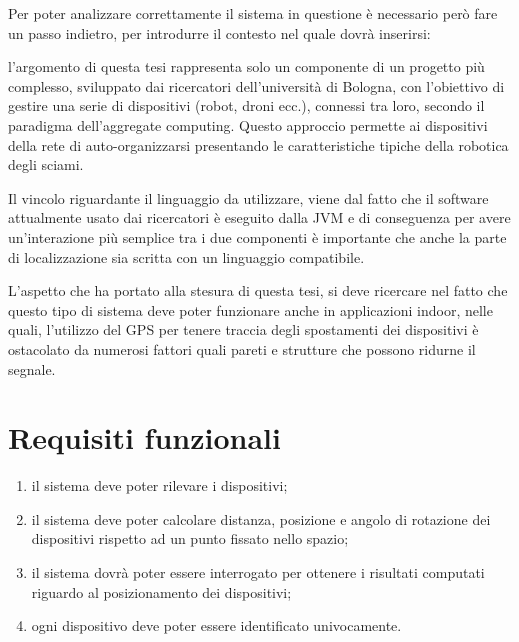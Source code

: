 \documentclass[12pt,a4paper,openright,twoside]{book}
\begin{document}
Per poter analizzare correttamente il sistema in questione è necessario però fare un passo indietro, per introdurre il contesto nel quale dovrà inserirsi:
\begin{adjustwidth}{1cm}{0cm}
l'argomento di questa tesi rappresenta solo un componente di un progetto più complesso, sviluppato dai ricercatori dell'università di Bologna, con l'obiettivo di gestire una serie di dispositivi (robot, droni ecc.), connessi tra loro, secondo il paradigma dell'aggregate computing.
Questo approccio permette ai dispositivi della rete di auto-organizzarsi presentando le caratteristiche tipiche della robotica degli sciami.

Il vincolo riguardante il linguaggio da utilizzare, viene dal fatto che il software attualmente usato dai ricercatori è eseguito dalla JVM e di conseguenza per avere un'interazione più semplice tra i due componenti è importante che anche la parte di localizzazione sia scritta con un linguaggio compatibile.
\end{adjustwidth}

L'aspetto che ha portato alla stesura di questa tesi, si deve ricercare nel fatto che questo tipo di sistema deve poter funzionare anche in applicazioni indoor, nelle quali, l'utilizzo del GPS per tenere traccia degli spostamenti dei dispositivi è ostacolato da numerosi fattori quali pareti e strutture che possono ridurne il segnale.

\section{Requisiti funzionali} \label{sec:requisiti_funzionali}
\begin{enumerate}[label=RF\arabic*]
	\item il sistema deve poter rilevare i dispositivi;
	\item il sistema deve poter calcolare distanza, posizione e angolo di rotazione dei dispositivi rispetto ad un punto fissato nello spazio;
	\item il sistema dovrà poter essere interrogato per ottenere i risultati computati riguardo al posizionamento dei dispositivi;
	\item ogni dispositivo deve poter essere identificato univocamente. \label{RF4}
\end{enumerate}
\end{document}
